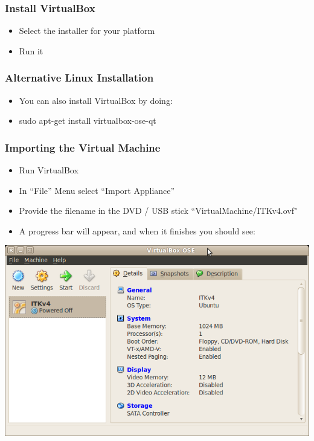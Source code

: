 \begin{frame}
\frametitle{Install VirtualBox}
\begin{itemize}
\item Select the installer for your platform
\item Run it
\end{itemize}
\end{frame}

\begin{frame}
\frametitle{Alternative Linux Installation}
\begin{itemize}
\item  You can also install VirtualBox by doing:
\item  sudo apt-get install virtualbox-ose-qt
\end{itemize}
\end{frame}

\begin{frame}
\frametitle{Importing the Virtual Machine}
\begin{itemize}
\item Run VirtualBox
\item In ``File'' Menu select ``Import Appliance''
\item Provide the filename in the DVD / USB stick ``VirtualMachine/ITKv4.ovf"
\item A progress bar will appear, and when it finishes you should see:
\end{itemize}
\begin{center}
  \includegraphics[width=0.5\paperwidth]{../Art/Screenshot-VirtualBox-OSE-01.png}
\end{center}
\end{frame}



